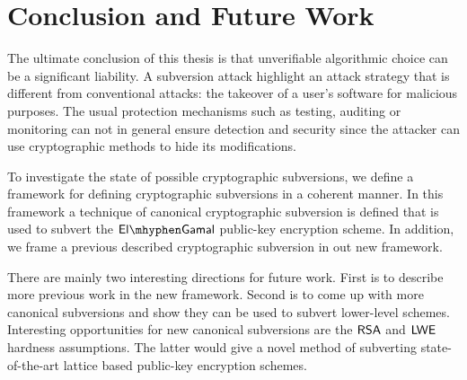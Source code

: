 \chapter{Conclusion and Future Work}
\label{cha:conclusionFutureWork}

The ultimate conclusion of this thesis is that unverifiable algorithmic choice can be a significant liability. A subversion attack highlight an attack strategy that is different from conventional attacks: the takeover of a user's software for malicious purposes. The usual protection mechanisms such as testing, auditing or monitoring can not in general ensure detection and security since the attacker can use cryptographic methods to hide its modifications. 

To investigate the state of possible cryptographic subversions, we define a framework for defining cryptographic subversions in a coherent manner. In this framework a technique of canonical cryptographic subversion is defined that is used to subvert the $\elGamal$ public-key encryption scheme. In addition, we frame a previous described cryptographic subversion in out new framework.

There are mainly two interesting directions for future work. First is to describe more previous work in the new framework. Second is to come up with more canonical subversions and show they can be used to subvert lower-level schemes. Interesting opportunities for new canonical subversions are the $\mathsf{RSA}$ and $\mathsf{LWE}$ hardness assumptions. The latter would give a novel method of subverting state-of-the-art lattice based public-key encryption schemes. 

